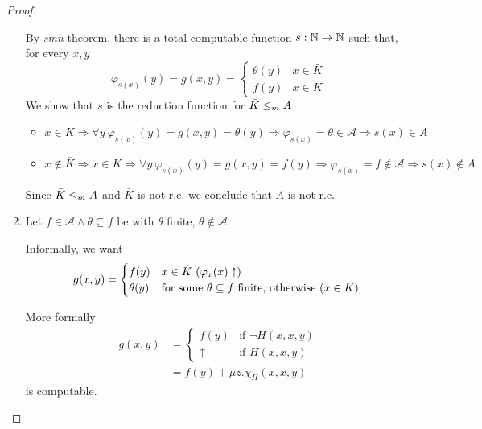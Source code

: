 \begin{proof}
\begin{enumerate}
    By \emph{smn} theorem, there is a total computable function $
    s:\mathbb{N}\rightarrow\mathbb{N} $ such that, for every $x, y$
    \begin{equation*}
      \varphi_{s(x)}(y) = g(x,y) = \begin{cases}
        \theta(y) & x \in \bar{K} \\
        f(y) & x \in K
      \end{cases}
    \end{equation*}
    We show that $s$ is the reduction function for $\bar{K}\leq_m A$

    \begin{itemize}
    \item $ x\in\bar{K} \Rightarrow \forall y\ \varphi_{s(x)}(y) = g(x,y) =
      \theta(y) \Rightarrow \varphi_{s(x)} = \theta \in \mathcal{A} \Rightarrow s(x) \in A $
    \item $ x\not\in\bar{K}\Rightarrow x\in K\Rightarrow\forall
      y\ \varphi_{s(x)}(y) = g(x,y)=f(y)\Rightarrow\varphi_{s(x)}=f \notin \mathcal{A}\Rightarrow
      s(x)\notin{A}$
    \end{itemize}
    Since $ \bar{K} \leq_m A$ and $\bar{K}$ is not r.e. we conclude that $A$ is
    not r.e.

    \item
    Let $f\in\mathcal{A}\land\theta\subseteq f$ be with $\theta$
    finite, $\theta\not\in\mathcal{A}$

    Informally, we want
    \begin{equation*}
      g(x,y) = \begin{cases}
        f(y) & x \in\bar{K} $ $(\varphi_x(x)\uparrow) \\
        \theta(y) & $for some $\theta\subseteq f$ finite, otherwise ($x\in K$) $
      \end{cases}
    \end{equation*}

    More formally
    \begin{align*}
      g(x,y) &= \begin{cases}
        f(y) & \mbox{if } \neg H(x,x,y) \\
        \uparrow & \mbox{if } H(x,x,y)
      \end{cases} \\
      &= f(y) + \mu z . \chi_H(x,x,y)
    \end{align*}
    is computable.


\end{enumerate}
\end{proof}
